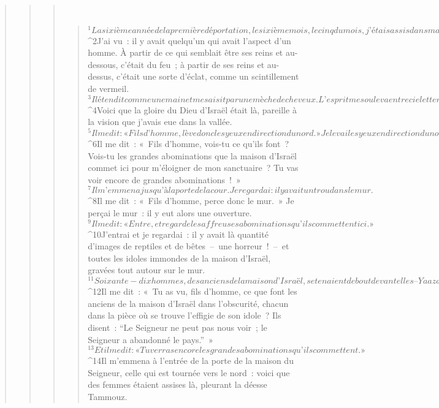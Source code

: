 \begin{verse}
\begin{verse}
\begin{verse}
         
      \bchapter{}
      \begin{verse}
${}^{1}La sixième année de la première déportation, le sixième mois, le cinq du mois, j’étais assis dans ma maison, et les anciens de Juda étaient assis devant moi ; là s’abattit sur moi la main du Seigneur Dieu.
${}^{2}J’ai vu : il y avait quelqu’un qui avait l’aspect d’un homme. À partir de ce qui semblait être ses reins et au-dessous, c’était du feu ; à partir de ses reins et au-dessus, c’était une sorte d’éclat, comme un scintillement de vermeil. 
${}^{3}Il étendit comme une main et me saisit par une mèche de cheveux. L’esprit me souleva entre ciel et terre. Il m’emmena jusqu’à Jérusalem, en des visions divines, à l’entrée de la porte intérieure, celle qui est tournée vers le nord ; là se trouve le siège de l’idole de la jalousie, qui provoque l’ardeur jalouse de Dieu. 
${}^{4}Voici que la gloire du Dieu d’Israël était là, pareille à la vision que j’avais eue dans la vallée.
${}^{5}Il me dit : « Fils d’homme, lève donc les yeux en direction du nord. » Je levai les yeux en direction du nord, et voici : au nord de la porte, il y avait un autel ; dans le passage se trouvait cette idole de la jalousie. 
${}^{6}Il me dit : « Fils d’homme, vois-tu ce qu’ils font ? Vois-tu les grandes abominations que la maison d’Israël commet ici pour m’éloigner de mon sanctuaire ? Tu vas voir encore de grandes abominations ! »
${}^{7}Il m’emmena jusqu’à la porte de la cour. Je regardai : il y avait un trou dans le mur. 
${}^{8}Il me dit : « Fils d’homme, perce donc le mur. » Je perçai le mur : il y eut alors une ouverture. 
${}^{9}Il me dit : « Entre, et regarde les affreuses abominations qu’ils commettent ici. » 
${}^{10}J’entrai et je regardai : il y avait là quantité d’images de reptiles et de bêtes – une horreur ! – et toutes les idoles immondes de la maison d’Israël, gravées tout autour sur le mur. 
${}^{11}Soixante-dix hommes, des anciens de la maison d’Israël, se tenaient debout devant elles – Yaazanyahou, fils de Shafane, était parmi eux. Chacun avait son encensoir à la main, et le parfum d’un nuage d’encens montait. 
${}^{12}Il me dit : « Tu as vu, fils d’homme, ce que font les anciens de la maison d’Israël dans l’obscurité, chacun dans la pièce où se trouve l’effigie de son idole ? Ils disent : “Le Seigneur ne peut pas nous voir ; le Seigneur a abandonné le pays.” » 
${}^{13}Et il me dit : « Tu verras encore les grandes abominations qu’ils commettent. »
${}^{14}Il m’emmena à l’entrée de la porte de la maison du Seigneur, celle qui est tournée vers le nord : voici que des femmes étaient assises là, pleurant la déesse Tammouz. 

\end{verse}
\end{verse}
\end{verse}
\end{verse}
